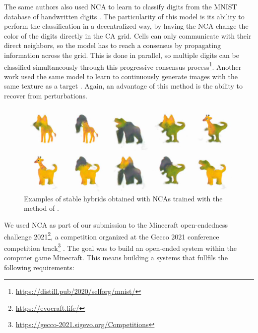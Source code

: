 The same authors also used \ac{NCA} to learn to classify digits from the MNIST
database of handwritten digits
\parencite{randazzoSelfclassifyingMNISTDigits2020}. The particularity of this
model is its ability to perform the classification in a decentralized way, by
having the \ac{NCA} change the color of the digits directly in the \ac{CA} grid.
Cells can only communicate with their direct neighbors, so the model has to
reach a consensus by propagating information across the grid. This is done in
parallel, so multiple digits can be classified simultaneously through this
progressive consensus
process\footnote{\url{https://distill.pub/2020/selforg/mnist/}}.
Another work used the same model to learn to continuously generate images with
the same texture as a target \parencite{niklassonSelfOrganisingTextures2021}.
Again, an advantage of this method is the ability to recover from perturbations.

\begin{figure}[htbp]
  \centering
  \includegraphics[width=.8\linewidth]{figures/nca_hybrids.png}
  \caption{Examples of stable hybrids obtained with \acp{NCA} trained with the
    method of \parencite{cisnerosOpenendedCreationHybrid2021}.}
  \label{fig:nca_hybrid}
\end{figure}


We used \ac{NCA} as part of our submission to the Minecraft open-endedness
challenge 2021\footnote{\url{https://evocraft.life/}}, a competition organized
at the Gecco 2021 conference competition
track\footnote{\url{https://gecco-2021.sigevo.org/Competitions}}
\parencite{cisnerosOpenendedCreationHybrid2021}. The goal was to build an
open-ended system within the computer game Minecraft. This means building a
systems that fullfils the following requirements:

